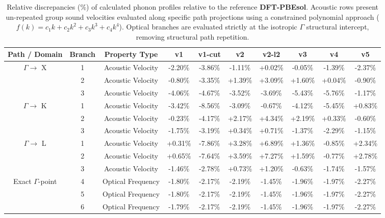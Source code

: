 \begin{table}[htbp]
  \centering
  \caption{Relative discrepancies (\%) of calculated phonon profiles relative to the reference \textbf{DFT-PBEsol}. Acoustic rows present un-repeated group sound velocities evaluated along specific path projections using a constrained polynomial approach ($f(k) = c_1 k + c_2 k^2 + c_3 k^3 + c_4 k^4$). Optical branches are evaluated strictly at the isotropic $\Gamma$ structural intercept, removing structural path repetition.}
  \label{tab:gamma_phonon_comparison}
  \begin{tabular}{cccccccccc}
    \hline\hline
    Path / Domain & Branch & Property Type  & v1 & v1-cut & v2 & v2-l2 & v3 & v4 & v5 \\
    \hline
    \midrule $\Gamma \rightarrow$ X & 1 & Acoustic Velocity  & -2.20\% & -3.86\% & -1.11\% & +0.02\% & -0.05\% & -1.39\% & -2.37\% \\
                                   & 2 & Acoustic Velocity  & -0.80\% & -3.35\% & +1.39\% & +3.09\% & +1.60\% & +0.04\% & -0.90\% \\
                                   & 3 & Acoustic Velocity  & -4.06\% & -4.67\% & -3.52\% & -3.69\% & -5.43\% & -5.76\% & -1.17\% \\
    \midrule $\Gamma \rightarrow$ K & 1 & Acoustic Velocity  & -3.42\% & -8.56\% & -3.09\% & -0.67\% & -4.12\% & -5.45\% & +0.83\% \\
                                   & 2 & Acoustic Velocity  & -0.23\% & -4.17\% & +2.17\% & +4.34\% & +2.19\% & +0.33\% & -0.60\% \\
                                   & 3 & Acoustic Velocity  & -1.75\% & -3.19\% & +0.34\% & +0.71\% & -1.37\% & -2.29\% & -1.15\% \\
    \midrule $\Gamma \rightarrow$ L & 1 & Acoustic Velocity  & +0.31\% & -7.86\% & +3.28\% & +6.89\% & +1.36\% & -0.85\% & +2.34\% \\
                                   & 2 & Acoustic Velocity  & +0.65\% & -7.64\% & +3.59\% & +7.27\% & +1.59\% & -0.77\% & +2.78\% \\
                                   & 3 & Acoustic Velocity  & -1.46\% & -2.78\% & +0.73\% & +1.20\% & -0.63\% & -1.74\% & -1.57\% \\
    \midrule Exact $\Gamma$-point  & 4 & Optical Frequency   & -1.80\% & -2.17\% & -2.19\% & -1.45\% & -1.96\% & -1.97\% & -2.27\% \\
                                   & 5 & Optical Frequency   & -1.80\% & -2.17\% & -2.19\% & -1.45\% & -1.96\% & -1.97\% & -2.27\% \\
                                   & 6 & Optical Frequency   & -1.79\% & -2.17\% & -2.19\% & -1.45\% & -1.96\% & -1.97\% & -2.27\% \\
    \hline\hline
  \end{tabular}
\end{table}
